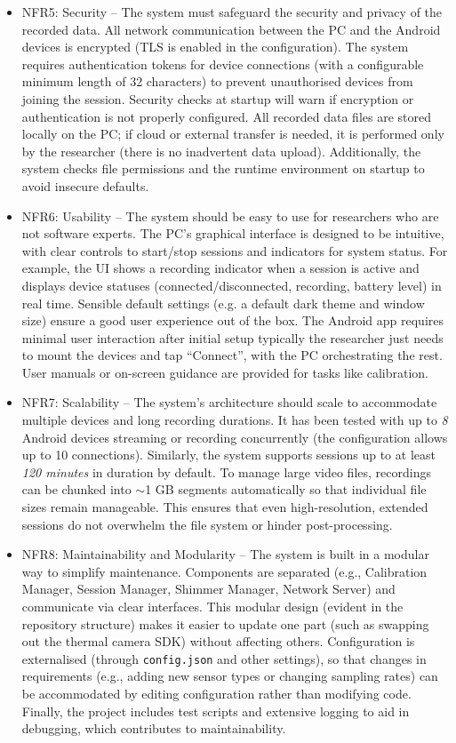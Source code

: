 \begin{itemize}
    \item NFR5: Security -- The system must safeguard the security and privacy of the recorded data. All network communication between the PC and the Android devices is encrypted (TLS is enabled in the configuration). The system requires authentication tokens for device connections (with a configurable minimum length of 32 characters) to prevent unauthorised devices from joining the session. Security checks at startup will warn if encryption or authentication is not properly configured. All recorded data files are stored locally on the PC; if cloud or external transfer is needed, it is performed only by the researcher (there is no inadvertent data upload). Additionally, the system checks file permissions and the runtime environment on startup to avoid insecure defaults.

    \item NFR6: Usability -- The system should be easy to use for researchers who are not software experts. The PC's graphical interface is designed to be intuitive, with clear controls to start/stop sessions and indicators for system status. For example, the UI shows a recording indicator when a session is active and displays device statuses (connected/disconnected, recording, battery level) in real time. Sensible default settings (e.g. a default dark theme and window size) ensure a good user experience out of the box. The Android app requires minimal user interaction after initial setup \textemdash typically the researcher just needs to mount the devices and tap ``Connect'', with the PC orchestrating the rest. User manuals or on-screen guidance are provided for tasks like calibration.

    \item NFR7: Scalability -- The system's architecture should scale to accommodate multiple devices and long recording durations. It has been tested with up to \emph{8} Android devices streaming or recording concurrently (the configuration allows up to 10 connections). Similarly, the system supports sessions up to at least \emph{120 minutes} in duration by default. To manage large video files, recordings can be chunked into $\sim$1 GB segments automatically so that individual file sizes remain manageable. This ensures that even high-resolution, extended sessions do not overwhelm the file system or hinder post-processing.

    \item NFR8: Maintainability and Modularity -- The system is built in a modular way to simplify maintenance. Components are separated (e.g., Calibration Manager, Session Manager, Shimmer Manager, Network Server) and communicate via clear interfaces. This modular design (evident in the repository structure) makes it easier to update one part (such as swapping out the thermal camera SDK) without affecting others. Configuration is externalised (through \texttt{config.json} and other settings), so that changes in requirements (e.g., adding new sensor types or changing sampling rates) can be accommodated by editing configuration rather than modifying code. Finally, the project includes test scripts and extensive logging to aid in debugging, which contributes to maintainability.
\end{itemize}


